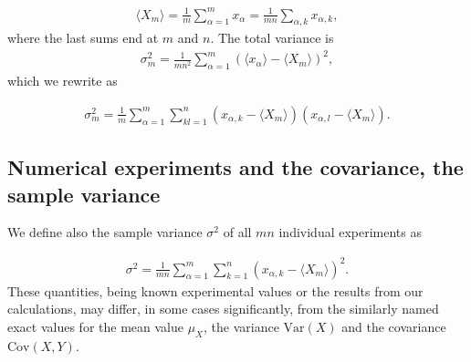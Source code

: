 \documentclass[letterpaper,10pt,english]{sphinxmanual}
\begin{document}
\begin{equation*}
\begin{split}
\begin{equation}
\langle X_m \rangle= \frac{1}{m}\sum_{\alpha=1}^mx_{\alpha}=\frac{1}{mn}\sum_{\alpha, k} x_{\alpha,k},
\label{eq:exptmean} \tag{6}
\end{equation}
\end{split}
\end{equation*}
where the last sums end at \(m\) and \(n\).
The total variance is
\begin{equation*}
\begin{split}
\sigma^2_m= \frac{1}{mn^2}\sum_{\alpha=1}^m(\langle x_{\alpha} \rangle-\langle X_m \rangle)^2,
\end{split}
\end{equation*}
which we rewrite as




\begin{equation*}
\begin{split}
\begin{equation}
\sigma^2_m=\frac{1}{m}\sum_{\alpha=1}^m\sum_{kl=1}^n (x_{\alpha,k}-\langle X_m \rangle)(x_{\alpha,l}-\langle X_m \rangle).
\label{eq:exptvariance} \tag{7}
\end{equation}
\end{split}
\end{equation*}

\subsection{Numerical experiments and the covariance, the sample variance}
\label{\detokenize{chapter2:numerical-experiments-and-the-covariance-the-sample-variance}}
We define also the sample variance \(\sigma^2\) of all \(mn\) individual experiments as




\begin{equation*}
\begin{split}
\begin{equation}
\sigma^2=\frac{1}{mn}\sum_{\alpha=1}^m\sum_{k=1}^n (x_{\alpha,k}-\langle X_m \rangle)^2.
\label{eq:sampleexptvariance} \tag{8}
\end{equation}
\end{split}
\end{equation*}
These quantities, being known experimental values or the results from our calculations,
may differ, in some cases
significantly,  from the similarly named
exact values for the mean value \(\mu_X\), the variance \(\mathrm{Var}(X)\)
and the covariance \(\mathrm{Cov}(X,Y)\).
\end{document}
